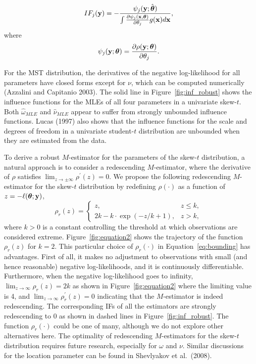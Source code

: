 \documentclass[12pt]{article}
\def\btheta{{\boldsymbol \theta}}
\def\bx{{\bf x}}
\def\by{{\bf y}}
\def\btheta{{\boldsymbol \theta}}
\def\bx{{\bf x}}
\def\by{{\bf y}}
\begin{document}
\begin{doublespacing}
\begin{equation*}
	IF_j(\by)=-\frac{\psi_j(\by;\hat{\btheta})}{\int \frac{ \partial \psi_j(\bx,\btheta)}{\partial \theta_j} g(\bx) d\bx},
\end{equation*}
 where
\begin{equation}\label{eq:psi}
	\psi_j(\by;\btheta)= \frac{\partial \rho(\by;\btheta)}{\partial \theta_j}.
\end{equation}

{For the MST distribution,  the derivatives of the negative log-likelihood for all parameters have closed forms except for $\nu$, which can be computed numerically (Azzalini and Capitanio 2003). } The solid line in Figure~\ref{fig:inf_robust}  shows   the influence functions for the MLEs of all four parameters in a univariate skew-$t$.  Both $\hat \omega_{MLE}$ and $\hat \nu_{MLE}$ appear to suffer from strongly unbounded influence functions.  Lucas (1997) also shows that the influence functions for the scale and degrees of freedom  in  a univariate student-$t$ distribution are unbounded when they are estimated from the data.  

{To derive  a robust $M$-estimator for the parameters of the skew-$t$ distribution, a natural approach is to consider a redescending $M$-estimator, where the derivative of $\rho$ satisfies $\lim_{z\to\pm\infty}\rho^\prime(z)=0$. We propose the following redescending $M$-estimator for the skew-$t$ distribution by redefining $\rho(\cdot)$ as a function of $z=-\ell(\btheta;\by)$,
\begin{equation}\label{eq:bounding}
\rho_{r}(z) = \left\{ \begin{array}{ll}
z, & z\leq k,\\
2k-k\cdot\exp(-z/k+1), & z>k,
\end{array} \right.
\end{equation}
where {$k>0$} is a constant controlling the threshold at which observations are considered extreme. Figure~\ref{fig:equation2} shows the trajectory of the function $\rho_r(z)$ for $k=2$. This particular choice of $\rho_r(\cdot)$ in Equation~\eqref{eq:bounding} has advantages. First of all, it makes no adjustment to observations with small (and hence reasonable) negative log-likelihoods, and it is continuously differentiable. Furthermore, when the negative log-likelihood goes to infinity, $\lim_{z\to\infty}\rho_r(z)=2k$ as shown in Figure~\ref{fig:equation2} where the limiting value is 4, and $\lim_{z\to\infty}\rho_r^\prime(z)=0$ indicating that the $M$-estimator is indeed redescending.  The corresponding IFs of all the estimators are strongly redescending to 0 as shown in dashed lines in Figure~\ref{fig:inf_robust}.  The function {$\rho_{r}(\cdot)$} could be one of many, although we do not explore other alternatives here. The optimality of redescending $M$-estimators for the skew-$t$ distribution requires future research, especially for $\omega$ and $\nu$. Similar discussions for the location parameter can be found in Shevlyakov et al.~(2008).}  


\end{doublespacing}
\end{document}
